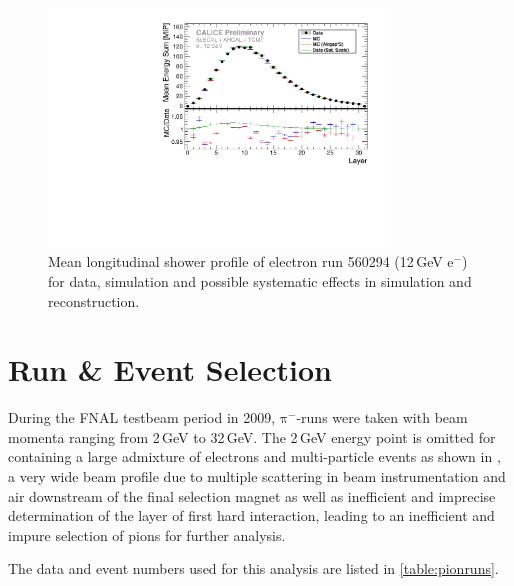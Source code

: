 \documentclass[twoside,a4paper,12pt]{article}
\newcommand\piminus{\(\mathrm{\pi^-}\)}
\newcommand\eminus{\(\mathrm{e^-}\)}
\begin{document}
\begin{figure}[htbp]
\begin{center}
\includegraphics[width=0.8\textwidth]{fig/electron/out_profileLongitudinal_560294_12GeV.pdf}
\caption{Mean longitudinal shower profile of electron run 560294 (12\,GeV \eminus) for data, simulation and possible systematic effects in simulation and reconstruction.}
\label{fig:electron_longitudinal}
\end{center}
\end{figure}


\section{Run \& Event Selection}
During the FNAL testbeam period in 2009, \piminus-runs were taken with beam momenta ranging from 2\,GeV to 32\,GeV. 
The 2\,GeV energy point is omitted for containing a large admixture of electrons and multi-particle events as shown in \cite{Feege, FTBF}, a very wide beam profile due to multiple scattering in beam instrumentation and air downstream of the final selection magnet as well as inefficient and imprecise determination of the layer of first hard interaction, leading to an inefficient and impure selection of pions for further analysis.

The data and event numbers used for this analysis are listed in \autoref{table:pionruns}.
\end{document}
